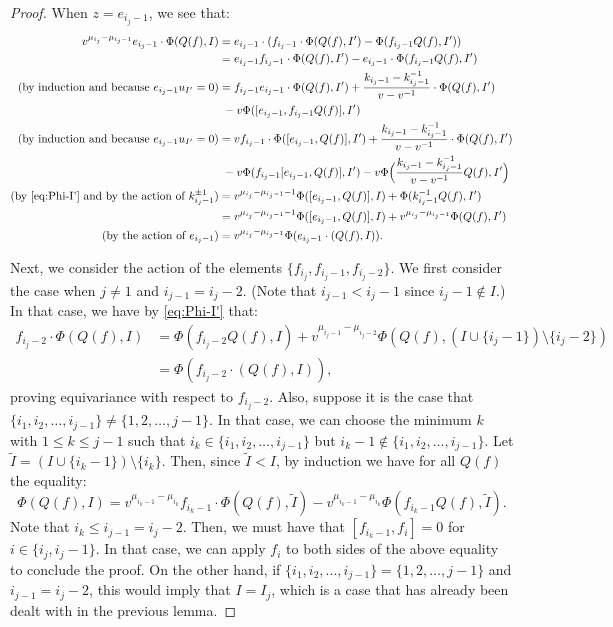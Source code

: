 \documentclass{amsart}
\numberwithin{equation}{section}
\theoremstyle{theorem}
\theoremstyle{definition}
\newcommand{\sm}{\setminus}
\begin{document}
\begin{proof}
 When $z=e_{i_j-1}$, we see that:
 \begin{align*}
 v^{\mu_{i_j}-\mu_{i_j-1}}e_{i_j-1}\cdot \Phi(Q(f),I)&=e_{i_j-1}\cdot(f_{i_j-1}\cdot \Phi(Q(f),I')-\Phi(f_{i_j-1}Q(f),I'))\\
 &=e_{i_j-1}f_{i_j-1}\cdot \Phi(Q(f),I')-e_{i_j-1}\cdot\Phi(f_{i_j-1}Q(f),I')\\
\text{(by induction and because $e_{i_j-1}u_{I'}=0$)}&=f_{i_j-1}e_{i_j-1}\cdot \Phi(Q(f),I')+\frac{k_{i_j-1}-k_{i_j-1}^{-1}}{v-v^{-1}}\cdot \Phi(Q(f),I')\\&~-v\Phi([e_{i_j-1},f_{i_j-1}Q(f)],I')\\
 \text{(by induction and because $e_{i_j-1}u_{I'}=0$)}  &=vf_{i_j-1}\cdot \Phi([e_{i_j-1},Q(f)],I')+\frac{k_{i_j-1}-k_{i_j-1}^{-1}}{v-v^{-1}} \cdot\Phi(Q(f),I')\\&~-v\Phi(f_{i_j-1}[e_{i_j-1},Q(f)],I')-v\Phi\Big(\frac{k_{i_j-1}-k_{i_j-1}^{-1}}{v-v^{-1}}Q(f),I'\Big)\\
\text{(by \eqref{eq:Phi-I'} and by the action of $k^{\pm 1}_{i_j-1}$)}  &=v^{\mu_{i_j}-\mu_{i_j-1}-1}\Phi([e_{i_j-1},Q(f)],I)+\Phi(k_{i_j-1}^{-1}Q(f),I')\\
    &=v^{\mu_{i_j}-\mu_{i_j-1}-1}\Phi([e_{i_j-1},Q(f)],I)+v^{\mu_{i_j}-\mu_{i_j-1}}\Phi(Q(f),I')\\
\text{(by the action of $e_{i_j-1}$)}  &=v^{\mu_{i_j}-\mu_{i_j-1}}\Phi(e_{i_j-1}\cdot(Q(f),I)).
 \end{align*}

Next, we consider the action of the elements $\{f_{i_j}, f_{i_j-1}, f_{i_j-2}\}$. We first consider the case when $j\neq 1$ and $i_{j-1}=i_j-2$. (Note that $i_{j-1}< i_j-1$ since $i_j-1\not\in I$.) In that case, we have by \eqref{eq:Phi-I'} that:
\begin{align*}f_{i_j-2}\cdot \Phi(Q(f),I) &= \Phi(f_{i_j-2}Q(f), I) + v^{\mu_{i_j-1}-\mu_{i_j-2}}\Phi(Q(f), (I\cup\{i_j-1\})\sm\{i_j-2\})\\
&= \Phi(f_{i_j-2}\cdot (Q(f),I)),\end{align*}
proving equivariance with respect to $f_{i_j-2}$. Also, suppose it is the case that $\{i_1,i_2,\dots, i_{j-1}\} \neq \{1,2,\dots, j-1\}$. In that case, we can choose the minimum $k$ with $1\leq k\leq j-1$ such that $i_k\in \{i_1,i_2,\dots, i_{j-1}\}$ but $i_k-1\not \in \{i_1,i_2,\dots, i_{j-1}\}$. Let $\widetilde I=(I\cup\{i_k-1\})\sm \{i_k\}$. Then, since $\widetilde{I}<I$, by induction we have for all $Q(f)$ the equality:
\[\Phi(Q(f),I)=v^{\mu_{i_k-1}-\mu_{i_k}}f_{i_k-1}\cdot \Phi(Q(f),\widetilde I)-v^{\mu_{i_k-1}-\mu_{i_k}}\Phi(f_{i_k-1}Q(f),\widetilde I).\]
Note that $i_k\leq i_{j-1}= i_j-2$. Then, we must have that $[f_{i_k-1},f_i]=0$ for $i\in\{i_j, i_j-1\}$. In that case, we can apply $f_i$ to both sides of the above equality to conclude the proof. On the other hand, if $\{i_1,i_2,\dots, i_{j-1}\}=\{1,2,\dots,j-1\}$ and $i_{j-1}=i_j-2$, this would imply that $I=I_{j}$, which is a case that has already been dealt with in the previous lemma.


\end{proof}
\end{document}
